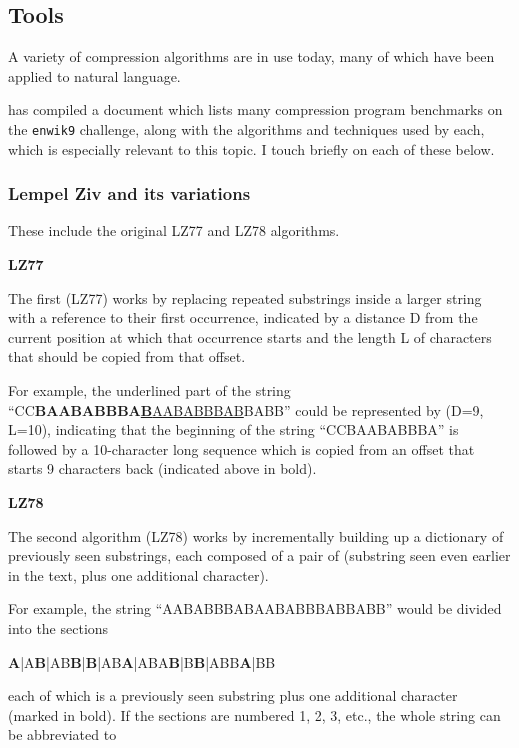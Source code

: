 \subsection{Tools}

A variety of compression algorithms are in use today, many of which have been applied to natural language.

\textcite{Mahoney2011} has compiled a document which lists many compression program benchmarks on the \texttt{enwik9} challenge, along with the algorithms and techniques used by each, which is especially relevant to this topic. I touch briefly on each of these below.

\subsubsection{Lempel Ziv and its variations}
These include the original LZ77 \autocite{Ziv1977} and LZ78 \autocite{Ziv1978} algorithms.

\textbf{LZ77}

The first (LZ77) works by replacing repeated substrings inside a larger string with a reference to their first occurrence, indicated by a distance D from the current position at which that occurrence starts and the length L of characters that should be copied from that offset.

For example, the underlined part of the string “CC\textbf{BAABABBBA\underline{B}}\underline{AABABBBAB}BABB” could be represented by (D=9, L=10), indicating that the beginning of the string “CCBAABABBBA” is followed by a 10-character long sequence which is copied from an offset that starts 9 characters back (indicated above in bold).

\textbf{LZ78}

The second algorithm (LZ78) works by incrementally building up a dictionary of previously seen substrings, each composed of a pair of (substring seen even earlier in the text, plus one additional character).

For example, the string “AABABBBABAABABBBABBABB” would be divided into the sections

\begin{center}
\textbf{A}|A\textbf{B}|AB\textbf{B}|\textbf{B}|AB\textbf{A}|ABA\textbf{B}|B\textbf{B}|ABB\textbf{A}|BB
\end{center}

each of which is a previously seen substring plus one additional character (marked in bold). If the sections are numbered 1, 2, 3, etc., the whole string can be abbreviated to

